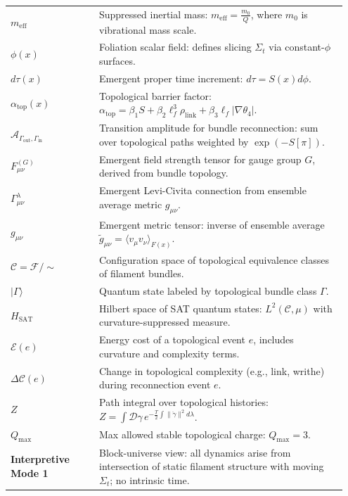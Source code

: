 \documentclass[12pt]{article}
\begin{document}
\begin{longtable}{p{0.25\linewidth} p{0.7\linewidth}}
$m_{\text{eff}}$ & Suppressed inertial mass: $m_{\text{eff}} = \frac{m_0}{Q}$, where $m_0$ is vibrational mass scale. \\
$\phi(x)$ & Foliation scalar field: defines slicing $\Sigma_t$ via constant-$\phi$ surfaces. \\
$d\tau(x)$ & Emergent proper time increment: $d\tau = S(x)d\phi$. \\
$\alpha_{\text{top}}(x)$ & Topological barrier factor: $\alpha_{\text{top}} = \beta_1 S + \beta_2 \ell_f^3 \rho_{\text{link}} + \beta_3 \ell_f |\nabla\theta_4|$. \\
$\mathcal{A}_{\Gamma_{\text{out}}, \Gamma_{\text{in}}}$ & Transition amplitude for bundle reconnection: sum over topological paths weighted by $\exp(-S[\pi])$. \\
$F_{\mu\nu}^{(G)}$ & Emergent field strength tensor for gauge group $G$, derived from bundle topology. \\
$\Gamma^\lambda_{\mu\nu}$ & Emergent Levi-Civita connection from ensemble average metric $g_{\mu\nu}$. \\
$g_{\mu\nu}$ & Emergent metric tensor: inverse of ensemble average $\tilde{g}_{\mu\nu} = \langle v_\mu v_\nu \rangle_{F(x)}$. \\
$\mathcal{C} = \mathcal{F}/\sim$ & Configuration space of topological equivalence classes of filament bundles. \\
$|\Gamma\rangle$ & Quantum state labeled by topological bundle class $\Gamma$. \\
$H_{\text{SAT}}$ & Hilbert space of SAT quantum states: $L^2(\mathcal{C}, \mu)$ with curvature-suppressed measure. \\
$\mathcal{E}(e)$ & Energy cost of a topological event $e$, includes curvature and complexity terms. \\
$\Delta\mathcal{C}(e)$ & Change in topological complexity (e.g., link, writhe) during reconnection event $e$. \\
$Z$ & Path integral over topological histories: $Z = \int \mathcal{D}\gamma \, e^{-\frac{T}{2} \int \|\ddot{\gamma}\|^2 d\lambda}$. \\
$Q_{\text{max}}$ & Max allowed stable topological charge: $Q_{\text{max}} = 3$. \\
\textbf{Interpretive Mode 1} & Block-universe view: all dynamics arise from intersection of static filament structure with moving $\Sigma_t$; no intrinsic time. \\
\end{longtable}
\end{document}
